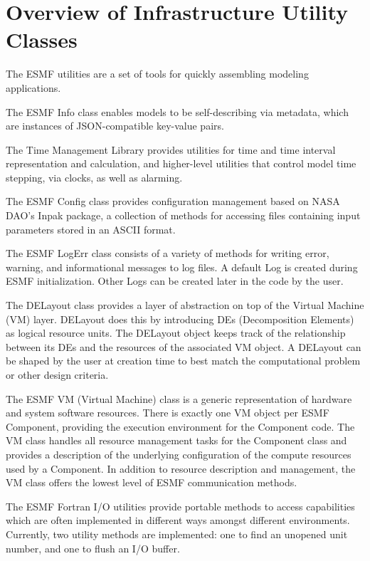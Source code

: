 %

\section{Overview of Infrastructure Utility Classes}

The ESMF utilities are a set of tools for quickly assembling modeling applications.

The ESMF Info class enables models to be self-describing via metadata, which are instances of JSON-compatible key-value pairs.

The Time Management Library provides utilities for time and time interval representation and calculation, and higher-level utilities that control model time stepping, via clocks, as well as alarming.

The ESMF Config class provides configuration management based on NASA DAO's Inpak package, a collection of methods for accessing files containing input parameters stored in an ASCII format.

The ESMF LogErr class consists of a variety of methods for writing error, warning, and informational messages to log files. A default Log is created during ESMF initialization. Other Logs can be created later in the code by the user.

The DELayout class provides a layer of abstraction on top of the Virtual Machine (VM) layer. DELayout does this by introducing DEs (Decomposition Elements) as logical resource units. The DELayout object keeps track of the relationship between its DEs and the resources of the associated VM object. A DELayout can be shaped by the user at creation time to best match the computational problem or other design criteria.

The ESMF VM (Virtual Machine) class is a generic representation of hardware and system software resources. There is exactly one VM object per ESMF Component, providing the execution environment for the Component code. The VM class handles all resource management tasks for the Component class and provides a description of the underlying configuration of the compute resources used by a Component.  In addition to resource description and management, the VM class offers the lowest level of ESMF communication methods.

The ESMF Fortran I/O utilities provide portable methods to access capabilities which are often implemented in different ways amongst different environments. Currently, two utility methods are implemented: one to find an unopened unit number, and one to flush an I/O buffer.
